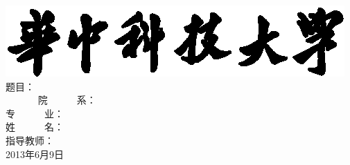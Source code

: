 %
%


\begin{titlepage}
  \renewcommand{\baselinestretch}{1.25}
\voffset 2.7cm
\begin{center}
  \includegraphics[]{img/hust-title}
  \vskip 0.6cm
  \chuhao{}
  \vskip 4cm
  {
    \sanhao\hei 题目：\hspace{0.2cm}\\[-1.1cm]
     ~~~~~~\hspace{0.9cm}\coverunderline[10.5cm]{\hspace{1cm}}
  }
  \vskip 2cm
  {
    \sihao\song 院~~~~~~系：\\
    \sihao\song 专~~~~~~业：\\
    \sihao\song 姓~~~~~~名：\\
    \sihao\song 指导教师： \\
  }
  \vskip 1cm
  {
    \sihao 2013年6月9日
  }

\end{center}
\end{titlepage}

  \renewcommand{\baselinestretch}{1.5}
\song \normalsize
